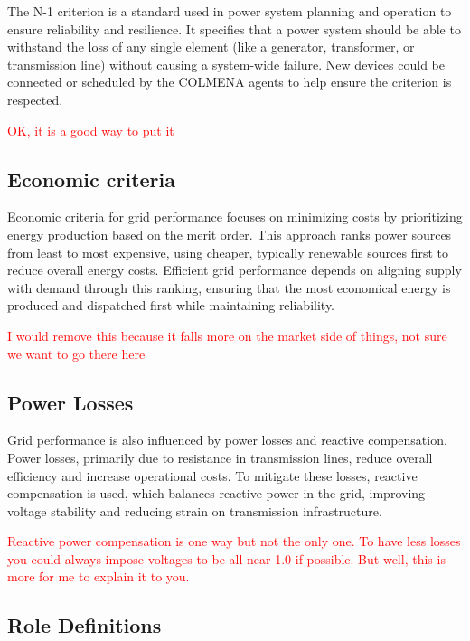 \documentclass{article}
\begin{document}
The N-1 criterion is a standard used in power system planning and operation to ensure reliability and resilience. It specifies that a power system should be able to withstand the loss of any single element (like a generator, transformer, or transmission line) without causing a system-wide failure. New devices could be connected or scheduled by the COLMENA agents to help ensure the criterion is respected. 

\textcolor{red}{OK, it is a good way to put it}




\subsection*{Economic criteria}

Economic criteria for grid performance focuses on minimizing costs by prioritizing energy production based on the merit order. This approach ranks power sources from least to most expensive, using cheaper, typically renewable sources first to reduce overall energy costs. Efficient grid performance depends on aligning supply with demand through this ranking, ensuring that the most economical energy is produced and dispatched first while maintaining reliability.

\textcolor{red}{I would remove this because it falls more on the market side of things, not sure we want to go there here}

\subsection*{Power Losses}

Grid performance is also influenced by power losses and reactive compensation. Power losses, primarily due to resistance in transmission lines, reduce overall efficiency and increase operational costs. To mitigate these losses, reactive compensation is used, which balances reactive power in the grid, improving voltage stability and reducing strain on transmission infrastructure.

\textcolor{red}{Reactive power compensation is one way but not the only one. To have less losses you could always impose voltages to be all near 1.0 if possible. But well, this is more for me to explain it to you. }

\subsection{Role Definitions}
\end{document}
